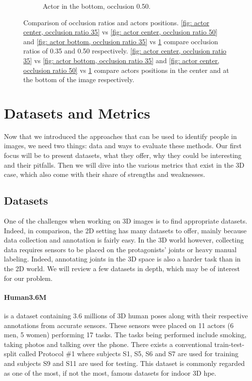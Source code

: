 \documentclass[runningheads]{llncs}
\begin{document}
\begin{figure}
\begin{subfigure}[t]{0.24\textwidth}
    \caption{Actor in the bottom, occlusion 0.50.}
    \label{fig: actor bottom, occlusion ratio 50}
  \end{subfigure}
  \caption{Comparison of occlusion ratios and actors positions. \ref{fig: actor center, occlusion ratio 35} vs \ref{fig: actor center, occlusion ratio 50} and \ref{fig: actor bottom, occlusion ratio 35} vs \ref{fig: actor bottom, occlusion ratio 50} compare occlusion ratios of 0.35 and 0.50 respectively. \ref{fig: actor center, occlusion ratio 35} vs \ref{fig: actor bottom, occlusion ratio 35} and \ref{fig: actor center, occlusion ratio 50} vs \ref{fig: actor bottom, occlusion ratio 50} compare actors positions in the center and at the bottom of the image respectively.}
  \label{fig: occlusion ratios and actors positions}
\end{figure}





\section{Datasets and Metrics}
Now that we introduced the approaches that can be used to identify people in images, we need two things: data and ways to evaluate these methods. Our first focus will be to present datasets, what they offer, why they could be interesting and their pitfalls. Then we will dive into the various metrics that exist in the 3D case, which also come with their share of strengths and weaknesses.

\subsection{Datasets}
One of the challenges when working on 3D images is to find appropriate datasets. Indeed, in comparison, the 2D setting has many datasets to offer, mainly because data collection and annotation is fairly easy. In the 3D world however, collecting data requires sensors to be placed on the protagonists' joints or heavy manual labeling. Indeed, annotating joints in the 3D space is also a harder task than in the 2D world. We will review a few datasets in depth, which may be of interest for our problem.
\paragraph{Human3.6M} \cite{Human3.6M} is a dataset containing 3.6 millions of 3D human poses along with their respective annotations from accurate sensors. These sensors were placed on 11 actors (6 men, 5 women) performing 17 tasks. The tasks being performed include smoking, taking photos and talking over the phone. There exists a conventional train-test-split called Protocol \#1 where subjects S1, S5, S6 and S7 are used for training and subjects S9 and S11 are used for testing. This dataset is commonly regarded as one of the most, if not the most, famous datasets for indoor 3D \ac{hpe}.
\end{document}
